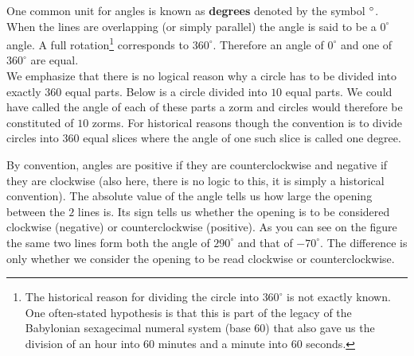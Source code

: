 \noindent One common unit for angles is known as \textbf{degrees} denoted by the symbol $\bf{^\circ}$. When the lines are overlapping (or simply parallel) the angle is said to be a $0^{\circ}$ angle. A full rotation\footnote{The historical reason for dividing the circle into $360^{\circ}$ is not exactly known. One often-stated hypothesis is that this is part of the legacy of the Babylonian sexagecimal numeral system (base 60) that also gave us the division of an hour into 60 minutes and a minute into 60 seconds.} corresponds to $360^{\circ}$. Therefore an angle of $0^{\circ}$ and one of $360^{\circ}$ are equal.\\

\noindent We emphasize that there is no logical reason why a circle has to be divided into exactly $360$ equal parts. Below is a circle divided into $10$ equal parts. We could have called the angle of each of these parts a zorm and circles would therefore be constituted of $10$ zorms. For historical reasons though the convention is to divide circles into $360$ equal slices where the angle of one such slice is called one degree.

\begin{center}
\end{center}
\noindent By convention, angles are positive if they are counterclockwise and negative if they are clockwise (also here, there is no logic to this, it is simply a historical convention). The absolute value of the angle tells us how large the opening between the $2$ lines is. Its sign tells us whether the opening is to be considered clockwise (negative) or counterclockwise (positive). As you can see on the figure the same two lines form both the angle of $290^{\circ}$ and that of $-70^{\circ}$. The difference is only whether we consider the opening to be read clockwise or counterclockwise.\\

